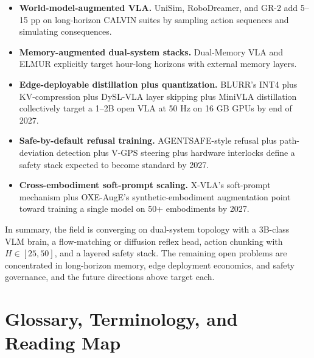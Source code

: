 \documentclass{article}
\begin{document}
\begin{itemize}

\item
  \textbf{World-model-augmented VLA.} UniSim, RoboDreamer, and GR-2 add 5--15 pp on long-horizon CALVIN suites by sampling action sequences and simulating consequences.
\item
  \textbf{Memory-augmented dual-system stacks.} Dual-Memory VLA \cite{li2026globalpriormeetslo} and ELMUR \cite{cherepanov2025elmurexternallayer} explicitly target hour-long horizons with external memory layers.
\item
  \textbf{Edge-deployable distillation plus quantization.} BLURR's INT4 plus KV-compression plus DySL-VLA layer skipping plus MiniVLA distillation collectively target a 1--2B open VLA at 50 Hz on 16 GB GPUs by end of 2027.
\item
  \textbf{Safe-by-default refusal training.} AGENTSAFE-style refusal plus path-deviation detection plus V-GPS steering plus hardware interlocks define a safety stack expected to become standard by 2027.
\item
  \textbf{Cross-embodiment soft-prompt scaling.} X-VLA's soft-prompt mechanism plus OXE-AugE's synthetic-embodiment augmentation point toward training a single model on 50+ embodiments by 2027.
\end{itemize}

In summary, the field is converging on dual-system topology with a 3B-class VLM brain, a flow-matching or diffusion reflex head, action chunking with \(H \in [25, 50]\), and a layered safety stack. The remaining open problems are concentrated in long-horizon memory, edge deployment economics, and safety governance, and the future directions above target each.

\section{Glossary, Terminology, and Reading Map}\label{glossary-terminology-and-reading-map}
\end{document}
